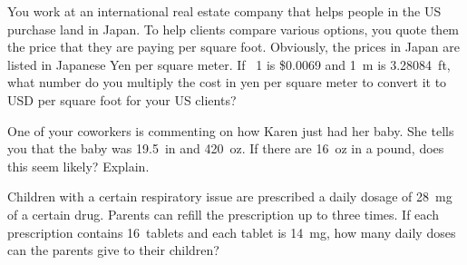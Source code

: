 \documentclass[11pt,letterpaper]{article}
\begin{document}
\newpage



 You work at an international real estate company that helps people in the US purchase land in Japan. To help clients compare various options, you quote them the price that they are paying per square foot. Obviously, the prices in Japan are listed in Japanese Yen per square meter. If \textyen\ 1 is \$0.0069 and 1~m is 3.28084~ft, what number do you multiply the cost in yen per square meter to convert it to USD per square foot for your US clients? 



\newpage



 One of your coworkers is commenting on how Karen just had her baby. She tells you that the baby was 19.5~in and 420~oz. If there are 16~oz in a pound, does this seem likely? Explain. 



\newpage



 Children with a certain respiratory issue are prescribed a daily dosage of 28~mg of a certain drug. Parents can refill the prescription up to three times. If each prescription contains 16~tablets and each tablet is 14~mg, how many daily doses can the parents give to their children?
\end{document}
